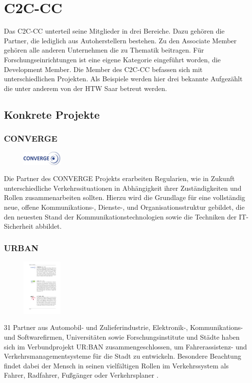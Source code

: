 \section{\acs{C2C-CC}}
Das \acl{C2C-CC} unterteil seine Mitglieder in drei Bereiche. Dazu gehören die Partner, die lediglich aus Autoherstellern bestehen. Zu den Associate Member gehören alle anderen Unternehmen die zu Thematik beitragen. Für Forschungseinrichtungen ist eine eigene Kategorie eingeführt worden, die Development Member. Die Member des \acl{C2C-CC} befassen sich mit unterschiedlichen Projekten. Als Beispiele werden hier drei bekannte Aufgezählt die unter anderem von der HTW Saar betreut werden.
\subsection{Konkrete Projekte}
\subsubsection{\acs{CONVERGE}}
\begin{figure}
  \centering
  	 \includegraphics[width=0.18\textwidth]{./content/images/logos/logo-projekte/converge_logo.pdf}
\end{figure}
Die Partner des \ac{CONVERGE} Projekts erarbeiten Regularien, wie in Zukunft unterschiedliche Verkehrssituationen in Abhängigkeit ihrer Zuständigkeiten und Rollen zusammenarbeiten sollten. Hierzu wird die Grundlage für eine vollständig neue, 
offene Kommunikations-, Dienste-, und Organisationsstruktur gebildet, die den neuesten Stand der Kommunikationstechnologien sowie die Techniken der IT-Sicherheit abbildet. \cite{convergeBeschreibung}

\subsubsection{\acs{URBAN}}
\begin{figure}
  \centering
  	 \includegraphics[width=0.18\textwidth]{./content/images/logos/logo-projekte/logo_simtd.pdf}
\end{figure}
31 Partner aus Automobil- und Zulieferindustrie, Elektronik-, Kommunikations- und Softwarefirmen, Universitäten sowie Forschungsinstitute und Städte haben sich im Verbundprojekt UR:BAN zusammengeschlossen, um Fahrerassistenz- und Verkehrsmanagementsysteme für die Stadt zu entwickeln. Besondere Beachtung findet dabei der Mensch in seinen vielfältigen Rollen im Verkehrssystem als Fahrer, Radfahrer, Fußgänger oder Verkehrsplaner \cite{urban_info}.

